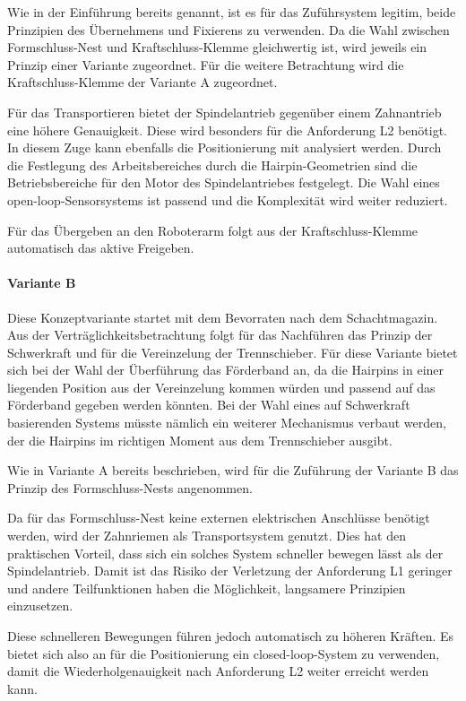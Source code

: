 Wie in der Einführung bereits genannt, ist es für das Zuführsystem legitim, beide Prinzipien des Übernehmens und Fixierens zu
verwenden. Da die Wahl zwischen Formschluss-Nest und Kraftschluss-Klemme gleichwertig ist, wird jeweils ein Prinzip einer Variante
zugeordnet. Für die weitere Betrachtung wird die Kraftschluss-Klemme der Variante A zugeordnet.

Für das Transportieren bietet der Spindelantrieb gegenüber einem Zahnantrieb eine höhere Genauigkeit. Diese wird besonders für
die Anforderung L2 benötigt. In diesem Zuge kann ebenfalls die Positionierung mit analysiert werden. Durch die Festlegung des
Arbeitsbereiches durch die Hairpin-Geometrien sind die Betriebsbereiche für den Motor des Spindelantriebes festgelegt. Die
Wahl eines open-loop-Sensorsystems ist passend und die Komplexität wird weiter reduziert.

Für das Übergeben an den Roboterarm folgt aus der Kraftschluss-Klemme automatisch das aktive Freigeben.

\paragraph{Variante B} Diese Konzeptvariante startet mit dem Bevorraten nach dem Schachtmagazin. Aus der Verträglichkeitsbetrachtung
folgt für das Nachführen das Prinzip der Schwerkraft und für die Vereinzelung der Trennschieber. Für diese Variante bietet sich bei der
Wahl der Überführung das Förderband an, da die Hairpins in einer liegenden Position aus der Vereinzelung kommen würden und passend
auf das Förderband gegeben werden könnten. Bei der Wahl eines auf Schwerkraft basierenden Systems müsste nämlich ein weiterer Mechanismus
verbaut werden, der die Hairpins im richtigen Moment aus dem Trennschieber ausgibt.

Wie in Variante A bereits beschrieben, wird für die Zuführung der Variante B das Prinzip des Formschluss-Nests angenommen.

Da für das Formschluss-Nest keine externen elektrischen Anschlüsse benötigt werden, wird der Zahnriemen als Transportsystem genutzt.
Dies hat den praktischen Vorteil, dass sich ein solches System schneller bewegen lässt als der Spindelantrieb. Damit ist das Risiko
der Verletzung der Anforderung L1 geringer und andere Teilfunktionen haben die Möglichkeit, langsamere Prinzipien einzusetzen.

Diese schnelleren Bewegungen führen jedoch automatisch zu höheren Kräften. Es bietet sich also an für die Positionierung ein
closed-loop-System zu verwenden, damit die Wiederholgenauigkeit nach Anforderung L2 weiter erreicht werden kann.

